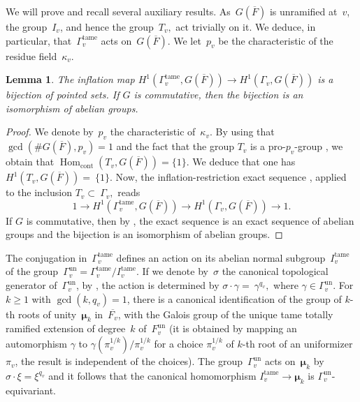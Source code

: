 \documentclass[a4paper,english,12pt]{amsart}
\newcommand{\vMFz}{v\in M_F ^0}
\newcommand{\piv}{\pi_v}
\newcommand{\Gfs}{G(\overline{F})}
\newcommand{\muu}{\boldsymbol{\mu}}
\DeclareMathOperator{\Hom}{Hom}
\DeclareMathOperator{\cont}{cont}
\DeclareMathOperator{\un}{un}
\DeclareMathOperator{\tame}{{tame}}
\newtheorem{lem}[equation]{Lemma}
\numberwithin{equation}{subsection}
\begin{document}
\subsubsection{} We will prove and recall several auxiliary results. As~$\Gfs$ is unramified at~$v$, the group~$I_v$, and hence the group~$T_v,$ act trivially on it. We deduce, in particular, that~$\Gamma_v^{\tame}$ acts  on~$\Gfs$. We let~$p_v$ be the characteristic of the residue field~$\kappa_v$.
\begin{lem}
The inflation map $H^1(\Gamma_v^{\tame}, \Gfs)\to H^1(\Gamma_v, \Gfs)$ is a bijection of pointed sets. If $G$ is commutative, then the bijection is an isomorphism of abelian groups.
\end{lem}
\begin{proof}We denote by~$p_v$ the characteristic of~$\kappa_v$. By using that $\gcd(\# \Gfs,p_v)=1$ and the fact that %
the group $T_v$ is a pro-$p_v$-group \cite[Proposition 7.5.1]{CohomologyNF}, we obtain that $\Hom_{\cont}(T_v,\Gfs)=\{1\}.$ %
We deduce that one has $H^1(T_v, \Gfs)=~\{1\}.$ %
Now, the inflation-restriction exact sequence \cite[Chapter I, \S 5.8 (a)]{Cohomologiegalois}, applied to the inclusion $T_v\subset~\Gamma_v,$ reads
$$1\to H^1(\Gamma_v^{\tame}, \Gfs)\to H^1(\Gamma_v, \Gfs)\to 1.$$ If $G$ is commutative, then by \cite[Chapter I, \S 2.6 (b)]{Cohomologiegalois}, the exact sequence is an exact sequence of abelian groups and the bijection is an isomorphism of abelian groups.
\end{proof}
The conjugation in~$\Gamma_v^{\tame}$ defines an action on its abelian normal subgroup~$I_v^{\tame}$ of the group~$\Gamma_v^{\un}=\Gamma_v^{\tame}/I_v^{\tame}$. If we denote by~$\sigma$ the canonical topological generator of~$\Gamma_v^{\un}$, by \cite[Page 410]{CohomologyNF}, the action is determined by $\sigma\cdot \gamma=~\gamma^{q_v},$ where $\gamma\in\Gamma_v^{\un}$. For $k\geq 1$ with $\gcd(k, q_v)=1$, there is a canonical identification of the group of $k$-th roots of unity~$\muu_k$ in~$\overline {F_v}$, with the Galois group of the unique tame totally ramified extension of degree~$k$ of~$F_v^{\un}$ (it is obtained by mapping an automorphism $\gamma$ to $\gamma(\piv^{1/k})/\piv^{1/k}$ for a choice $\piv^{1/k}$ of $k$-th root of an uniformizer~$\piv$, the result is independent of the choices). The group~$\Gamma_v^{\un}$ acts on~$\muu_k$ by $\sigma\cdot \xi=\xi^{q_v}$ and it follows that the canonical homomorphism $I_v^{\tame}\to \muu_k$ is $\Gamma_v^{\un}$-equivariant. 
  
\end{document}

